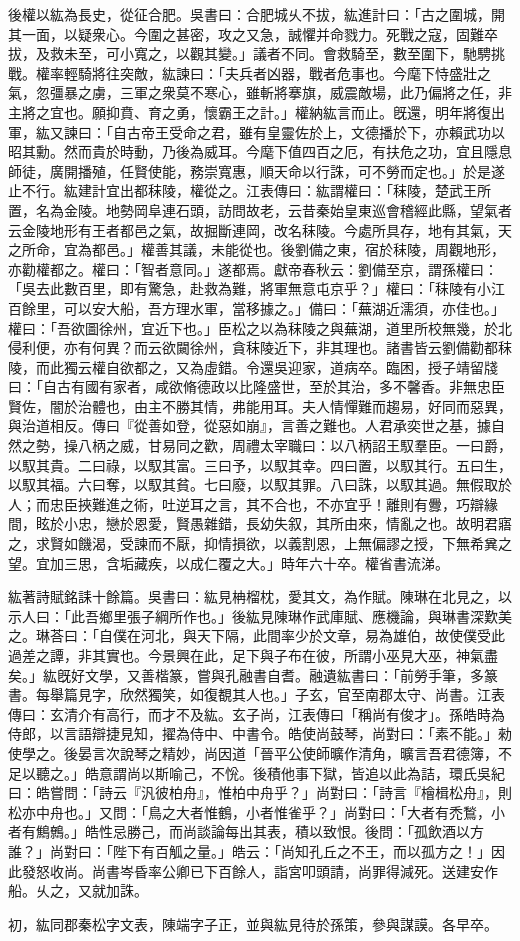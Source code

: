 \begin{pinyinscope}
後權以紘為長史，從征合肥。吳書曰：合肥城乆不拔，紘進計曰：「古之圍城，開其一面，以疑衆心。今圍之甚密，攻之又急，誠懼并命戮力。死戰之寇，固難卒拔，及救未至，可小寬之，以觀其變。」議者不同。會救騎至，數至圍下，馳騁挑戰。權率輕騎將往突敵，紘諫曰：「夫兵者凶器，戰者危事也。今麾下恃盛壯之氣，忽彊暴之虜，三軍之衆莫不寒心，雖斬將搴旗，威震敵場，此乃偏將之任，非主將之宜也。願抑賁、育之勇，懷霸王之計。」權納紘言而止。旣還，明年將復出軍，紘又諫曰：「自古帝王受命之君，雖有皇靈佐於上，文德播於下，亦賴武功以昭其勳。然而貴於時動，乃後為威耳。今麾下值四百之厄，有扶危之功，宜且隱息師徒，廣開播殖，任賢使能，務崇寬惠，順天命以行誅，可不勞而定也。」於是遂止不行。紘建計宜出都秣陵，權從之。江表傳曰：紘謂權曰：「秣陵，楚武王所置，名為金陵。地勢岡阜連石頭，訪問故老，云昔秦始皇東巡會稽經此縣，望氣者云金陵地形有王者都邑之氣，故掘斷連岡，改名秣陵。今處所具存，地有其氣，天之所命，宜為都邑。」權善其議，未能從也。後劉備之東，宿於秣陵，周觀地形，亦勸權都之。權曰：「智者意同。」遂都焉。獻帝春秋云：劉備至京，謂孫權曰：「吳去此數百里，即有驚急，赴救為難，將軍無意屯京乎？」權曰：「秣陵有小江百餘里，可以安大船，吾方理水軍，當移據之。」備曰：「蕪湖近濡須，亦佳也。」權曰：「吾欲圖徐州，宜近下也。」臣松之以為秣陵之與蕪湖，道里所校無幾，於北侵利便，亦有何異？而云欲闚徐州，貪秣陵近下，非其理也。諸書皆云劉備勸都秣陵，而此獨云權自欲都之，又為虛錯。令還吳迎家，道病卒。臨困，授子靖留牋曰：「自古有國有家者，咸欲脩德政以比隆盛世，至於其治，多不馨香。非無忠臣賢佐，闇於治體也，由主不勝其情，弗能用耳。夫人情憚難而趨易，好同而惡異，與治道相反。傳曰『從善如登，從惡如崩』，言善之難也。人君承奕世之基，據自然之勢，操八柄之威，甘易同之歡，周禮太宰職曰：以八柄詔王馭羣臣。一曰爵，以馭其貴。二曰祿，以馭其富。三曰予，以馭其幸。四曰置，以馭其行。五曰生，以馭其福。六曰奪，以馭其貧。七曰廢，以馭其罪。八曰誅，以馭其過。無假取於人；而忠臣挾難進之術，吐逆耳之言，其不合也，不亦宜乎！離則有釁，巧辯緣間，眩於小忠，戀於恩愛，賢愚雜錯，長幼失叙，其所由來，情亂之也。故明君寤之，求賢如饑渴，受諫而不厭，抑情損欲，以義割恩，上無偏謬之授，下無希兾之望。宜加三思，含垢藏疾，以成仁覆之大。」時年六十卒。權省書流涕。

紘著詩賦銘誄十餘篇。吳書曰：紘見柟榴枕，愛其文，為作賦。陳琳在北見之，以示人曰：「此吾鄉里張子綱所作也。」後紘見陳琳作武庫賦、應機論，與琳書深歎美之。琳荅曰：「自僕在河北，與天下隔，此間率少於文章，易為雄伯，故使僕受此過差之譚，非其實也。今景興在此，足下與子布在彼，所謂小巫見大巫，神氣盡矣。」紘旣好文學，又善楷篆，嘗與孔融書自耆。融遺紘書曰：「前勞手筆，多篆書。每舉篇見字，欣然獨笑，如復覩其人也。」子玄，官至南郡太守、尚書。江表傳曰：玄清介有高行，而才不及紘。玄子尚，江表傳曰「稱尚有俊才」。孫皓時為侍郎，以言語辯捷見知，擢為侍中、中書令。皓使尚鼓琴，尚對曰：「素不能。」勑使學之。後晏言次說琴之精妙，尚因道「晉平公使師曠作清角，曠言吾君德簿，不足以聽之。」皓意謂尚以斯喻己，不恱。後積他事下獄，皆追以此為詰，環氏吳紀曰：皓嘗問：「詩云『汎彼柏舟』，惟柏中舟乎？」尚對曰：「詩言『檜楫松舟』，則松亦中舟也。」又問：「鳥之大者惟鶴，小者惟雀乎？」尚對曰：「大者有禿鶖，小者有鷦鷯。」皓性忌勝己，而尚談論每出其表，積以致恨。後問：「孤飲酒以方誰？」尚對曰：「陛下有百觚之量。」皓云：「尚知孔丘之不王，而以孤方之！」因此發怒收尚。尚書岑昏率公卿已下百餘人，詣宮叩頭請，尚罪得減死。送建安作船。乆之，又就加誅。

初，紘同郡秦松字文表，陳端字子正，並與紘見待於孫策，參與謀謨。各早卒。


\end{pinyinscope}